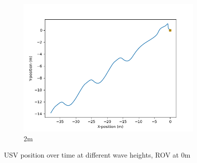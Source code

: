 \documentclass[class=article, crop=false]{standalone}
\begin{document}
\begin{figure}
\begin{subfigure}[b]{0.48\textwidth}
        \centering
        \includegraphics{scenario1/rov-0m/2.0m/usv_position_uncontrolled}
        \caption{2m}
        \label{}
    \end{subfigure}

    \caption{USV position over time at different wave heights, ROV at 0m}
\end{figure}
\end{document}
